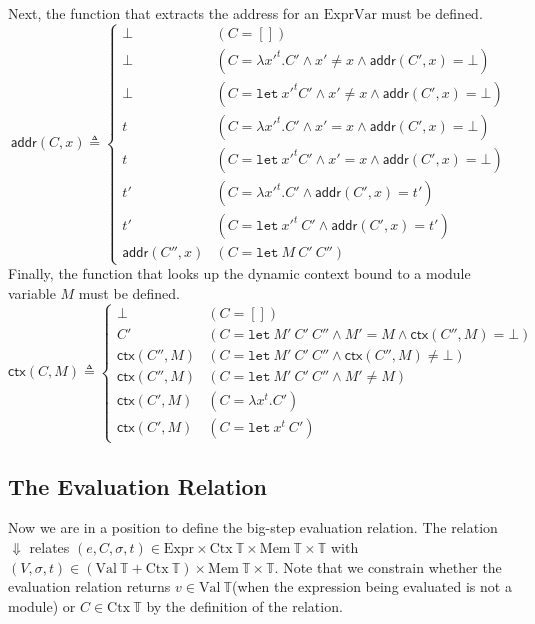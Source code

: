 \documentclass{article}
\theoremstyle{definition}
\newcommand*{\Expr}{\text{Expr}}
\newcommand*{\ExprVar}{\text{ExprVar}}
\newcommand*{\Time}{\mathbb{T}}
\newcommand*{\Ctx}[1]{\text{Ctx}\:{#1}}
\newcommand*{\Value}[1]{\text{Val}\:{#1}}
\newcommand*{\Mem}[1]{\text{Mem}\:{#1}}
\newcommand*{\addr}{\mathsf{addr}}
\newcommand*{\modctx}{\mathsf{ctx}}
\begin{document}
Next, the function that extracts the address for an $\ExprVar$ must be defined.
\[
  \addr(C,x)\triangleq
  \begin{cases}
    \bot         & (C=[])                                                           \\
    \bot         & (C=\lambda x'^{t}.C'\wedge x'\neq x\wedge \addr(C',x)=\bot)      \\
    \bot         & (C=\mathtt{let}\:x'^{t}C'\wedge x'\neq x\wedge \addr(C',x)=\bot) \\
    t            & (C=\lambda x'^{t}.C'\wedge x'= x\wedge \addr(C',x)=\bot)         \\
    t            & (C=\mathtt{let}\:x'^{t}C'\wedge x'= x\wedge \addr(C',x)=\bot)    \\
    t'           & (C=\lambda x'^{t}.C'\wedge \addr(C',x)=t')                       \\
    t'           & (C=\mathtt{let}\:x'^{t}\:C'\wedge \addr(C',x)=t')                \\
    \addr(C'',x) & (C=\mathtt{let}\:M\:C'\:C'')
  \end{cases}
\]
Finally, the function that looks up the dynamic context bound to a module variable $M$ must be defined.
\[
  \modctx(C,M)\triangleq
  \begin{cases}
    \bot           & (C=[])                                                             \\
    C'             & (C=\mathtt{let}\:M'\:C'\:C''\wedge M'= M\wedge\modctx(C'',M)=\bot) \\
    \modctx(C'',M) & (C=\mathtt{let}\:M'\:C'\:C''\wedge\modctx(C'',M)\neq\bot)          \\
    \modctx(C'',M) & (C=\mathtt{let}\:M'\:C'\:C''\wedge M'\neq M)                       \\
    \modctx(C',M)  & (C=\lambda x^{t}.C')                                               \\
    \modctx(C',M)  & (C=\mathtt{let}\:x^{t}\:C')
  \end{cases}
\]

\subsection{The Evaluation Relation}

Now we are in a position to define the big-step evaluation relation.
The relation $\Downarrow$ relates $(e,C,\sigma,t)\in\Expr\times\Ctx{\Time}\times\Mem{\Time}\times\Time$ with
$(V,\sigma,t)\in(\Value{\Time}+\Ctx{\Time})\times\Mem{\Time}\times\Time$.
Note that we constrain whether the evaluation relation returns $v\in\Value{\Time}$(when the expression being evaluated is not a module) or $C\in\Ctx{\Time}$ by the definition of the relation.
\end{document}
